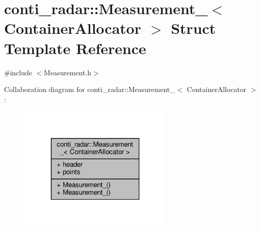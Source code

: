 \hypertarget{structconti__radar_1_1Measurement__}{}\section{conti\+\_\+radar\+:\+:Measurement\+\_\+$<$ Container\+Allocator $>$ Struct Template Reference}
\label{structconti__radar_1_1Measurement__}


{\ttfamily \#include $<$Measurement.\+h$>$}



Collaboration diagram for conti\+\_\+radar\+:\+:Measurement\+\_\+$<$ Container\+Allocator $>$\+:\nopagebreak
\begin{figure}[H]
\begin{center}
\leavevmode
\includegraphics[width=210pt]{d4/d81/structconti__radar_1_1Measurement____coll__graph}
\end{center}
\end{figure}
